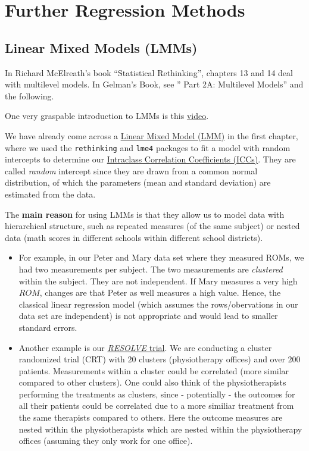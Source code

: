 \documentclass[
]{article}
\author{}
\date{\vspace{-2.5em}}
\begin{document}
\section{Further Regression Methods}\label{further-regression-methods}

\subsection{Linear Mixed Models (LMMs)}\label{linear-mixed-models-lmms}

In Richard McElreath's book ``Statistical Rethinking'', chapters 13 and
14 deal with multilevel models. In Gelman's Book, see '' Part 2A:
Multilevel Models'' and the following.

One very graspable introduction to LMMs is this
\href{https://www.youtube.com/watch?v=QCqF-2E86r0&ab_channel=MatthewE.Clapham}{video}.

We have already come across a
\href{https://en.wikipedia.org/wiki/Mixed_model}{Linear Mixed Model
(LMM)} in the first chapter, where we used the \texttt{rethinking} and
\texttt{lme4} packages to fit a model with random intercepts to
determine our
\href{https://jdegenfellner.github.io/Script_QM3_ZHAW/reliability-and-validity.html\#ICC}{Intraclass
Correlation Coefficients (ICCs)}. They are called \emph{random}
intercept since they are drawn from a common normal distribution, of
which the parameters (mean and standard deviation) are estimated from
the data.

The \textbf{main reason} for using LMMs is that they allow us to model
data with hierarchical structure, such as repeated measures (of the same
subject) or nested data (math scores in different schools within
different school districts).

\begin{itemize}
\item
  For example, in our Peter and Mary data set where they measured ROMs,
  we had two measurements per subject. The two measurements are
  \emph{clustered} within the subject. They are not independent. If Mary
  measures a very high \(ROM\), changes are that Peter as well measures
  a high value. Hence, the classical linear regression model (which
  assumes the rows/obervations in our data set are independent) is not
  appropriate and would lead to smaller standard errors.
\item
  Another example is our
  \href{https://www.zhaw.ch/en/research/project/74535}{\emph{RESOLVE}
  trial}. We are conducting a cluster randomized trial (CRT) with \(20\)
  clusters (physiotherapy offices) and over \(200\) patients.
  Measurements within a cluster could be correlated (more similar
  compared to other clusters). One could also think of the
  physiotherapists performing the treatments as clusters, since -
  potentially - the outcomes for all their patients could be correlated
  due to a more similiar treatment from the same therapists compared to
  others. Here the outcome measures are nested within the
  physiotherapists which are nested within the physiotherapy offices
  (assuming they only work for one office).
\end{itemize}
\end{document}
